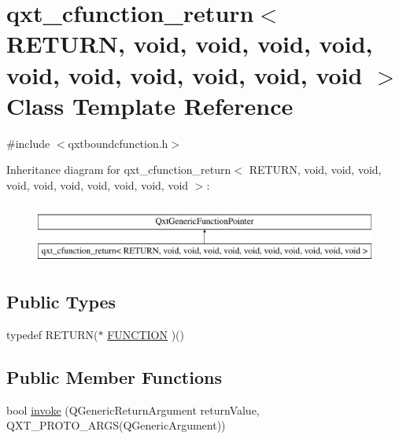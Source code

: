 \hypertarget{classqxt__cfunction__return_3_01_r_e_t_u_r_n_00_01void_00_01void_00_01void_00_01void_00_01void_0ce0c927a0f7891905ce6ba11f318d802}{\section{qxt\-\_\-cfunction\-\_\-return$<$ R\-E\-T\-U\-R\-N, void, void, void, void, void, void, void, void, void, void $>$ Class Template Reference}
\label{classqxt__cfunction__return_3_01_r_e_t_u_r_n_00_01void_00_01void_00_01void_00_01void_00_01void_0ce0c927a0f7891905ce6ba11f318d802}
}


{\ttfamily \#include $<$qxtboundcfunction.\-h$>$}

Inheritance diagram for qxt\-\_\-cfunction\-\_\-return$<$ R\-E\-T\-U\-R\-N, void, void, void, void, void, void, void, void, void, void $>$\-:\begin{figure}[H]
\begin{center}
\leavevmode
\includegraphics[height=2.000000cm]{classqxt__cfunction__return_3_01_r_e_t_u_r_n_00_01void_00_01void_00_01void_00_01void_00_01void_0ce0c927a0f7891905ce6ba11f318d802}
\end{center}
\end{figure}
\subsection*{Public Types}
\begin{DoxyCompactItemize}
\item 
typedef R\-E\-T\-U\-R\-N($\ast$ \hyperlink{classqxt__cfunction__return_3_01_r_e_t_u_r_n_00_01void_00_01void_00_01void_00_01void_00_01void_0ce0c927a0f7891905ce6ba11f318d802_a297376d0a9e412e14a1b832d6ea02e8a}{F\-U\-N\-C\-T\-I\-O\-N} )()
\end{DoxyCompactItemize}
\subsection*{Public Member Functions}
\begin{DoxyCompactItemize}
\item 
bool \hyperlink{classqxt__cfunction__return_3_01_r_e_t_u_r_n_00_01void_00_01void_00_01void_00_01void_00_01void_0ce0c927a0f7891905ce6ba11f318d802_a06351e34d19296a06e1bb8e73a49379c}{invoke} (Q\-Generic\-Return\-Argument return\-Value, Q\-X\-T\-\_\-\-P\-R\-O\-T\-O\-\_\-A\-R\-G\-S(Q\-Generic\-Argument))
\end{DoxyCompactItemize}
